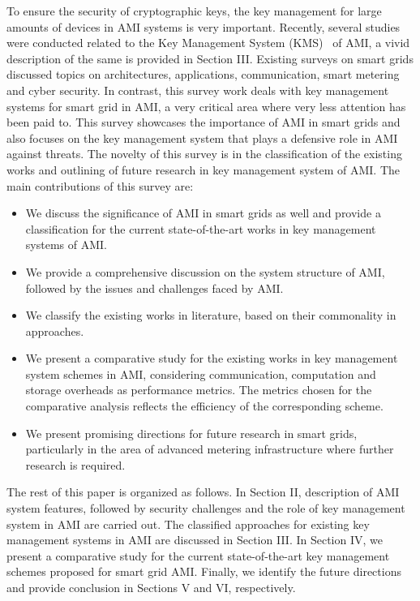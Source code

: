 \par To ensure the security of cryptographic keys, the key management for large amounts of devices in AMI systems is very important. Recently, several studies were conducted related to the Key Management System (KMS)~\cite{Mohammadali18} of AMI, a vivid description of the same is provided in Section III. Existing surveys on smart grids discussed topics on architectures, applications, communication, smart metering and cyber security. In contrast, this survey work deals with key management systems for smart grid in AMI, a very critical area where very less attention has been paid to. This survey showcases the importance of AMI in smart grids and also focuses on the key management system that plays a defensive role in AMI against threats. The novelty of this survey is in the classification of the existing works and outlining of future research in key management system of AMI. The main contributions of this survey are:
 
\begin{itemize}
\item We discuss the significance of AMI in smart grids as well and provide a classification for the current state-of-the-art works in key management systems of AMI.
\item We provide a comprehensive discussion on the system structure of AMI, followed by the issues and challenges faced by AMI.  
\item We classify the existing works in literature, based on their commonality in approaches. 
\item We present a comparative study for the existing works in key management system schemes in AMI, considering communication, computation and storage overheads as performance metrics. The metrics chosen for the comparative analysis reflects the efficiency of the corresponding scheme.
\item We present promising directions for future research in smart grids, particularly in the area of advanced metering infrastructure where further research is required.
\end{itemize}

The rest of this paper is organized as follows. In Section II, description of AMI system features, followed by security challenges and the role of key management system in AMI are carried out. The classified approaches for existing key management systems in AMI are discussed in Section III. In Section IV, we present a comparative study for the current state-of-the-art key management schemes proposed for smart grid AMI. Finally, we identify the future directions and provide conclusion in Sections V and VI, respectively.

